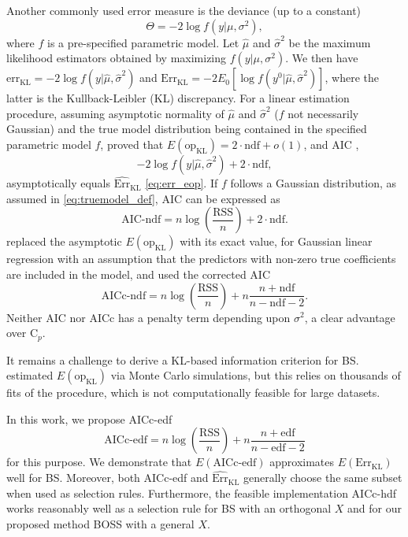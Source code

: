 Another commonly used error measure is the deviance (up to a constant)
\begin{equation}
\Theta = -2 \log f(y|\mu,\sigma^2),
\label{eq:deviance_def}
\end{equation}
where $f$ is a pre-specified parametric model. Let $\hat{\mu}$ and $\hat{\sigma}^2$ be the maximum likelihood estimators obtained by maximizing $f(y|\mu,\sigma^2)$. We then have $\text{err}_{\text{KL}} = -2 \log f (y|\hat{\mu},\hat{\sigma}^2)$ and $\text{Err}_{\text{KL}}  = -2 E_0 \left[ \log f(y^0|\hat{\mu},\hat{\sigma}^2)\right] $, where the latter is the Kullback-Leibler (KL) discrepancy. For a linear estimation procedure, assuming asymptotic normality of $\hat{\mu}$ and $\hat{\sigma}^2$ ($f$ not necessarily Gaussian) and the true model distribution being contained in the specified parametric model $f$, \citet{konishi2008information} proved that $E(\text{op}_{\text{KL}}) = 2 \cdot \text{ndf} + o(1)$, and AIC \citep{Akaike1973},
\begin{equation*}
-2 \log f (y|\hat{\mu},\hat{\sigma}^2) + 2 \cdot \text{ndf},
\end{equation*}
asymptotically equals $\widehat{\text{Err}}_\text{KL}$ \eqref{eq:err_eop}. If $f$ follows a Gaussian distribution, as assumed in \eqref{eq:truemodel_def}, AIC can be expressed as
\begin{equation*}
\text{AIC-ndf} = n \log\left(\frac{\text{RSS}}{n}\right) + 2 \cdot \text{ndf}.
\end{equation*}
\citet{Hurvich1989} replaced the asymptotic $E(\text{op}_\text{KL})$ with its exact value, for Gaussian linear regression with an assumption that the predictors with non-zero true coefficients are included in the model, and used the corrected AIC
\begin{equation*}
\text{AICc-ndf} = n \log\left(\frac{\text{RSS}}{n}\right) + n \frac{n+\text{ndf}}{n-\text{ndf}-2}.
\label{eq:aicc_ndf}
\end{equation*}
Neither AIC nor AICc has a penalty term depending upon $\sigma^2$, a clear advantage over C$_p$.

It remains a challenge to derive a KL-based information criterion for BS. \citet{Liao2018} estimated $E(\text{op}_{\text{KL}})$ via Monte Carlo simulations, but this relies on thousands of fits of the procedure, which is not computationally feasible for large datasets. 

In this work, we propose AICc-edf
\begin{equation}
\text{AICc-edf} = n \log\left(\frac{\text{RSS}}{n}\right) + n \frac{n+\text{edf}}{n-\text{edf}-2}
\label{eq:aicc_edf}
\end{equation}
for this purpose. We demonstrate that $E(\text{AICc-edf})$ approximates $E(\text{Err}_\text{KL})$ well for BS. Moreover, both AICc-edf and $\widehat{\text{Err}}_\text{KL}$ generally choose the same subset when used as selection rules. Furthermore, the feasible implementation AICc-hdf works reasonably well as a selection rule for BS with an orthogonal $X$ and for our proposed method BOSS with a general $X$. 



